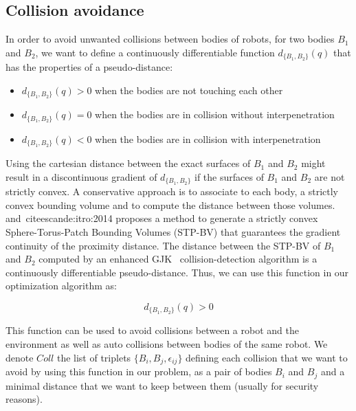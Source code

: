 \subsection{Collision avoidance}
\label{sub:collision_avoidance}


In order to avoid unwanted collisions between bodies of robots, for two bodies $B_1$ and $B_2$, we want to define a continuously differentiable function $d_{\{B_1, B_2\}}(q)$ that has the properties of a pseudo-distance:
\begin{itemize}
  \item $d_{\{B_1, B_2\}}(q) > 0$ when the bodies are not touching each other
  \item $d_{\{B_1, B_2\}}(q) = 0$ when the bodies are in collision without interpenetration
  \item $d_{\{B_1, B_2\}}(q) < 0$ when the bodies are in collision with interpenetration
\end{itemize}

Using the cartesian distance between the exact surfaces of $B_1$ and $B_2$ might result in a discontinuous gradient of $d_{\{B_1, B_2\}}$ if the surfaces of $B_1$ and $B_2$ are not strictly convex.
A conservative approach is to associate to each body, a strictly convex bounding volume and to compute the distance between those volumes.
\cite{escande:humanoids:2007} and~cite{escande:itro:2014} proposes a method to generate a strictly convex Sphere-Torus-Patch Bounding Volumes (STP-BV) that guarantees the gradient continuity of the proximity distance.
The distance between the STP-BV of $B_1$ and $B_2$ computed by an enhanced GJK~\cite{gilbert-1988a} collision-detection algorithm is a continuously differentiable pseudo-distance.
Thus, we can use this function in our optimization algorithm as:

\begin{equation}
  \boxed{d_{\{B_1, B_2\}}(q) > 0}
\end{equation}

This function can be used to avoid collisions between a robot and the environment as well as auto collisions between bodies of the same robot.
We denote $Coll$ the list of triplets $\{B_i, B_j, \epsilon_{ij}\}$ defining each collision that we want to avoid by using this function in our problem, as a pair of bodies $B_i$ and $B_j$ and a minimal distance that we want to keep between them (usually for security reasons).

